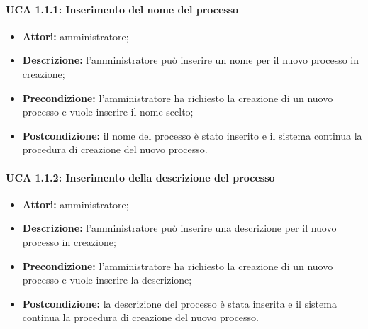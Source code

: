 \paragraph{UCA 1.1.1: Inserimento del nome del processo}
\begin{itemize}
\item \textbf{Attori:} 
amministratore;
\item \textbf{Descrizione:} 
l'amministratore può inserire un nome per il nuovo processo in creazione; 
\item \textbf{Precondizione:}
l'amministratore ha richiesto la creazione di un nuovo processo e vuole inserire il nome scelto;
\item \textbf{Postcondizione:} 
il nome del processo è stato inserito e il sistema continua la procedura di creazione del nuovo processo.
\end{itemize}

\paragraph{UCA 1.1.2: Inserimento della descrizione del processo}
\begin{itemize}
\item \textbf{Attori:} 
amministratore;
\item \textbf{Descrizione:} 
l'amministratore può inserire una descrizione per il nuovo processo in creazione; 
\item \textbf{Precondizione:}
l'amministratore ha richiesto la creazione di un nuovo processo e vuole inserire la descrizione;
\item \textbf{Postcondizione:} 
la descrizione del processo è stata inserita e il sistema continua la procedura di creazione del nuovo processo.
\end{itemize}


